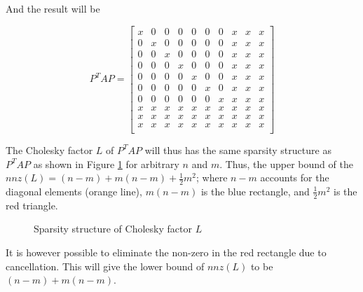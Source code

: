 And the result will be 

$$
P^{T}AP = 
\begin{bmatrix}
x &  0 &  0 &  0 &  0 &  0 &  0 &  x &  x &  x\\
0 &  x &  0 &  0 &  0 &  0 &  0 &  x &  x &  x\\
0 &  0 &  x &  0 &  0 &  0 &  0 &  x &  x &  x\\
0 &  0 &  0 &  x &  0 &  0 &  0 &  x &  x &  x\\
0 &  0 &  0 &  0 &  x &  0 &  0 &  x &  x &  x\\
0 &  0 &  0 &  0 &  0 &  x &  0 &  x &  x &  x\\
0 &  0 &  0 &  0 &  0 &  0 &  x &  x &  x &  x\\
x &  x &  x &  x &  x &  x &  x &  x &  x &  x\\
x &  x &  x &  x &  x &  x &  x &  x &  x &  x\\
x &  x &  x &  x &  x &  x &  x &  x &  x &  x\\       
\end{bmatrix}
$$

The Cholesky factor $L$ of $P^{T}AP$ will thus has the same sparsity structure as $P^{T}AP$ as shown in Figure \ref{fig:mat} for arbitrary $n$ and $m$. Thus, the upper bound of the $nnz(L) = (n-m) + m(n-m) + \frac{1}{2}m^{2}$; where $n - m$ accounts for the diagonal elements (orange line), $m(n-m)$ is the blue rectangle, and $\frac{1}{2}m^{2}$ is the red triangle. 


\begin{figure}[!tbh]
\centering        
   \caption{Sparsity structure of Cholesky factor $L$}
  \label{fig:mat}
\end{figure}

It is however possible to eliminate the non-zero in the red rectangle due to cancellation. This will give the lower bound of $nnz(L)$ to be $(n-m) + m(n-m)$. 
